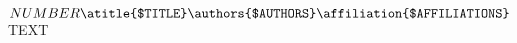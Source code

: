 $NUMBER

\atitle{$TITLE}

\bigskip

\authors{$AUTHORS}

\affiliation{$AFFILIATIONS}

\bigskip

\noindent $TEXT
